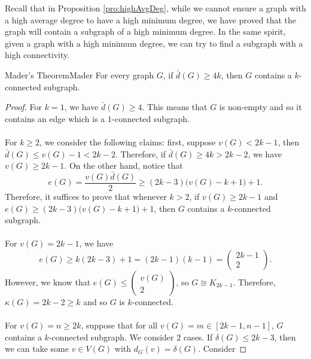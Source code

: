 \documentclass[math, code]{amznotes}
\theoremstyle{remark}
\begin{document}
Recall that in Proposition \ref{pro:highAvgDeg}, while we cannot ensure a graph with a high average degree to have a high minimum degree, we have proved that the graph will contain a subgraph of a high minimum degree. In the same spirit, given a graph with a high minimum degree, we can try to find a subgraph with a high connectivity.
\begin{thmbox}{Mader's Theorem}{Mader}
    For every graph $G$, if $\bar{d}(G) \geq 4k$, then $G$ contains a $k$-connected subgraph.
    \tcblower
    \begin{proof}
        For $k = 1$, we have $\bar{d}(G) \geq 4$. This means that $G$ is non-empty and so it contains an edge which is a $1$-connected subgraph.
        \\\\
        For $k \geq 2$, we consider the following claims: first, suppose $v(G) < 2k - 1$, then $\bar{d}(G) \leq v(G) - 1 < 2k - 2$. Therefore, if $\bar{d}(G) \geq 4k > 2k - 2$, we have $v(G) \geq 2k - 1$. On the other hand, notice that
        \begin{equation*}
            e(G) = \frac{v(G)\bar{d}(G)}{2} \geq (2k - 3)\bigl(v(G) - k + 1\bigr) + 1.
        \end{equation*}
        Therefore, it suffices to prove that whenever $k > 2$, if $v(G) \geq 2k - 1$ and $e(G) \geq (2k - 3)\bigl(v(G) - k + 1\bigr) + 1$, then $G$ contains a $k$-connected subgraph.
        \\\\
        For $v(G) = 2k - 1$, we have 
        \begin{equation*}
            e(G) \geq k(2k - 3) + 1 = (2k - 1)(k - 1) = \begin{pmatrix}
                2k - 1 \\
                2
            \end{pmatrix}.
        \end{equation*}
        However, we know that $e(G) \leq \left(\begin{smallmatrix}
            v(G) \\
            2
        \end{smallmatrix}\right)$, so $G \cong K_{2k - 1}$. Therefore, $\kappa(G) = 2k - 2 \geq k$ and so $G$ is $k$-connected.
        \\\\
        For $v(G) = n \geq 2k$, suppose that for all $v(G) = m \in [2k - 1, n - 1]$, $G$ contains a $k$-connected subgraph. We consider $2$ cases. If $\delta(G) \leq 2k - 3$, then we can take some $v \in V(G)$ with $d_G(v) = \delta(G)$. Consider

\end{proof}
\end{thmbox}
\end{document}
